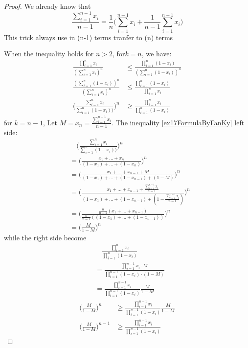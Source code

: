\begin{example}
\begin{proof}
We already know that
\begin{equation*}
	\frac{\sum_{i=1}^{n-1} x_i}{n-1} = \frac{1}{n}\Big(\sum_{i=1}^{n-1}x_i+\frac{1}{n-1}\sum_{i=1}^{n-1}x_i\Big)
\end{equation*}
This trick always use in (n-1) terms tranfer to (n) terms

 When the inequality holds for $ n>2 $, for$ k=n $, we have:
\begin{align*}
	\frac{\prod_{i=1}^n x_i}{(\sum_{i=1}^n x_i)^n} &\le \frac{\prod_{i=1}^n(1-x_i)}{(\sum_{i=1}^n(1-x_i))^n}\\
	\frac{(\sum_{i=1}^n(1-x_i))^n}{(\sum_{i=1}^n x_i)^n} &\le \frac{\prod_{i=1}^n(1-x_i)}{\prod_{i=1}^n x_i}\\	
	\Bigg(\frac{\sum_{i=1}^n x_i}{\sum_{i=1}^n (1-x_i))}\Bigg)^n &\ge
	 \frac{\prod_{i=1}^n x_i}{\prod_{i=1}^n (1-x_i)}
\end{align*}
for $ k=n-1 $, Let $ M = x_n = \frac{\sum_{i=1}^{n-1} x_i}{n-1} $. The inequality \ref{ex17FormulaByFanKy} left side: 
\begin{align*}
	&\quad\Bigg(\frac{\sum_{i=1}^n x_i}{\sum_{i=1}^n (1-x_i))}\Bigg)^n \\
	&=\Bigg(\frac{x_1+\dots+x_n}{(1-x_1)+\dots+(1-x_n)}\Bigg)^n\\
	&=\Bigg(\frac{x_1+\dots+x_{n-1} + M}{(1-x_1)+\dots+(1-x_{n-1}) + (1-M)}\Bigg)^n\\
	&=\Bigg(\frac{x_1+\dots+x_{n-1} + \frac{\sum_{i=1}^{n-1} x_i}{n-1}}{(1-x_1)+\dots+(1-x_{n-1}) + (1-\frac{\sum_{i=1}^{n-1} x_i}{n-1})}\Bigg)^n\\
	&=\Bigg(\frac{\frac{n}{n-1}(x_1+\dots+x_{n-1})}{\frac{n}{n-1}((1-x_1)+\dots+(1-x_{n-1}))}\Bigg)^n\\
	&=\Bigg(\frac{M}{1-M}\Bigg)^n	
\end{align*}
while the right side become
\begin{align*}
	&\quad\frac{\prod_{i=1}^n x_i}{\prod_{i=1}^n (1-x_i)}\\
	&=\frac{\prod_{i=1}^{n-1} x_i \cdot M}{\prod_{i=1}^{n-1} (1-x_i)\cdot(1-M)}\\
	&=\frac{\prod_{i=1}^{n-1} x_i}{\prod_{i=1}^{n-1} (1-x_i)}\frac{M}{1-M}
\end{align*}
\begin{align*}
	\Bigg(\frac{M}{1-M}\Bigg)^n &\ge \frac{\prod_{i=1}^{n-1} x_i}{\prod_{i=1}^{n-1} (1-x_i)}\frac{M}{1-M}\\
	\Bigg(\frac{M}{1-M}\Bigg)^{n-1} &\ge \frac{\prod_{i=1}^{n-1} x_i}{\prod_{i=1}^{n-1} (1-x_i)}
\end{align*}
\end{proof}
\end{example}
